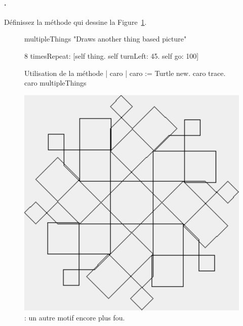 

\paragraph{.}
D\'efinissez la m\'ethode  qui dessine la Figure~\ref{c7multipleThings}.

\begin{figure} 
\begin{minipage}[c]{.55\linewidth}
\begin{nmethode}
multipleThings
    "Draws another thing based picture"

    8 timesRepeat: [self thing. 
                   self turnLeft: 45. 
                   self go: 100]
\end{nmethode}
\begin{ncscript}{Utilisation de la m\'ethode }
| caro |
caro := Turtle new.
caro trace.
caro multipleThings
\end{ncscript}
\end{minipage}
\hfill
\begin{minipage}[c]{.45\linewidth}
\centerline{\includegraphics[width=\linewidth]{c7things}}
\end{minipage}
\caption{ : un autre motif encore plus fou.}
\label{c7multipleThings}
\end{figure}



